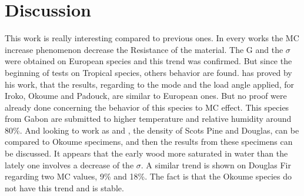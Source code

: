 \documentclass[3p,times,procedia]{elsarticle}
\begin{document}



\section{Discussion}\label{S:dis}

This work is really interesting compared to previous ones. In every works the MC increase phenomenon decrease the Resistance of the material. The G and the $\sigma$ were obtained on European species and this trend was confirmed. But since the beginning of tests on Tropical species, others behavior are found. \cite{Reference7} has proved by his work, that the results, regarding to the mode and the load angle applied, for Iroko, Okoume and Padouck, are similar to European ones. But no proof were already done concerning the behavior of this species to MC effect. This species from Gabon are submitted to higher temperature and relative humidity around 80\%. And looking to work as \cite{Kif1998} and \cite{Ang2017}, the density of Scots Pine and Douglas, can be compared to Okoume specimens, and then the results from these specimens can be discussed. It appears that the early wood more saturated in water than the lately one involves a decrease of the $\sigma$. A similar trend is shown on Douglas Fir regarding two MC values, 9\% and 18\%. The fact is that the Okoume species do not have this trend and is stable.
\end{document}
